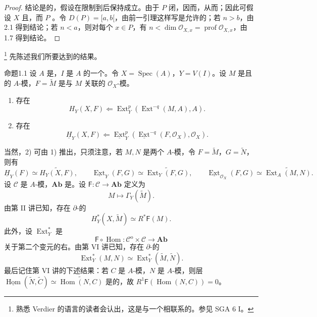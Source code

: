 \begin{proof}
结论是的，假设在限制到后保持成立。由于 $P$ 闭，因而，从而；因此可假设 $X$ 且，而 $P$ 。令 $D(P)=[a,b[$，由前一引理这样写是允许的；若 $n>b$，由 2.1 得到结论；若 $n<a$，则对每个 $x\in P$，有 $n<\dim\mathscr O_{X,x}=\operatorname{prof}\mathscr O_{X,x}$，由 1.7 得到结论。
\end{proof}

\footnote{熟悉 Verdier 的语言的读者会认出，这是与一个相联系的。参见 SGA 6 I。}
先陈述我们所要达到的结果。
\begin{SGAresult}{命题}{1.1}
设 $A$ 是，$I$ 是 $A$ 的一个。令 $X=\operatorname{Spec}(A)$，$Y=V(I)$。设 $M$ 是且的 $A$-模，$F=\widetilde M$ 是与 $M$ 关联的 $\mathscr O_X$-模。
\begin{enumerate}
\item[1)] 存在
\[H_Y(X,F)\Longleftarrow\operatorname{Ext}^p_Y(\operatorname{Ext}^{-q}(M,A),A).\]
\item[2)] 存在
\[\underline H_Y(X,F)\Longleftarrow\underline{\operatorname{Ext}}^p_Y(\underline{\operatorname{Ext}}^{-q}(F,\mathscr O_X),\mathscr O_X).\]
\end{enumerate}
\end{SGAresult}
当然，2) 可由 1) 推出，只须注意，若 $M,N$ 是两个 $A$-模，令 $F=\widetilde M$，$G=\widetilde N$，则有
\[
\underline H_Y(F)\simeq\widetilde{H_Y(X,F)},\qquad
\underline{\operatorname{Ext}}_Y(F,G)\simeq\widetilde{\operatorname{Ext}_Y(F,G)},\qquad
\underline{\operatorname{Ext}}_{\mathscr O_X}(F,G)\simeq\widetilde{\operatorname{Ext}_A(M,N)}.
\]
设 $\mathcal C$ 是 $A$-模，$\mathbf{Ab}$ 是。设 $\mathsf F:\mathcal C\to\mathbf{Ab}$ 定义为
\[M\longmapsto\Gamma_Y(\widetilde M).\]
由第 II 讲已知，存在 $\partial$-的
\[H^*_Y(X,\widetilde M)\simeq R^*\mathsf F(M).\]
此外，设 $\operatorname{Ext}^*_Y$ 是
\[\mathsf F\circ\operatorname{Hom}:\mathcal C^{\mathrm o}\times\mathcal C\longrightarrow\mathbf{Ab}\]
关于第二个变元的右。由第 VI 讲已知，存在 $\partial$-的
\[\operatorname{Ext}^*_Y(M,N)\simeq\operatorname{Ext}^*_Y(\widetilde M,\widetilde N).\]
最后记住第 VI 讲的下述结果：若 $C$ 是 $A$-模，$N$ 是 $A$-模，则层 $\underline{\operatorname{Hom}}(\widetilde N,\widetilde C)\simeq\widetilde{\operatorname{Hom}(N,C)}$ 是的，故 $R^1\mathsf F(\operatorname{Hom}(N,C))=0$。

